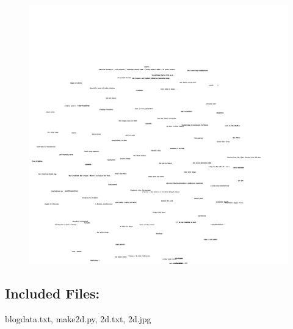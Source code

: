 \documentclass[a4paper, 11pt]{article}
\begin{document}
\begin{figure}[H]
\centering
\includegraphics[scale=0.25]{2d.jpg}
\end{figure}

\subsection*{Included Files:}
blogdata.txt, make2d.py, 2d.txt, 2d.jpg
\end{document}
